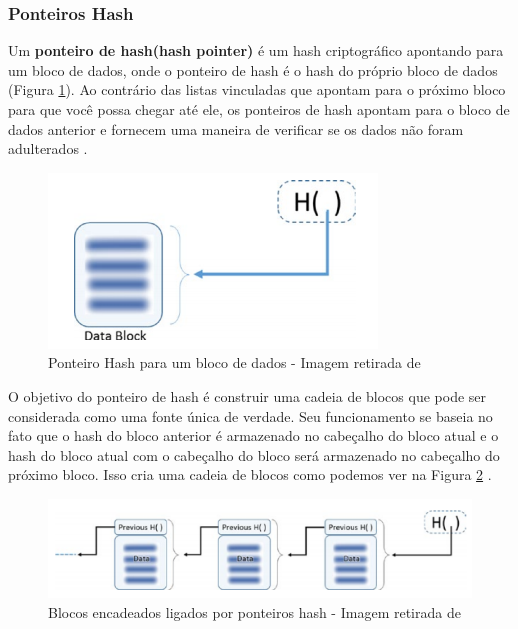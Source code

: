     
        \subsubsection{Ponteiros Hash}
        
            Um \textbf{ponteiro de hash(hash pointer)} é um hash criptográfico apontando para um bloco de dados, onde o ponteiro de hash é o hash do próprio bloco de dados (Figura \ref{fig:hash_pointer}). Ao contrário das listas vinculadas que apontam para o próximo bloco para que você possa chegar até ele, os ponteiros de hash apontam para o bloco de dados anterior e fornecem uma maneira de verificar se os dados não foram adulterados \cite{beginnig_blockchain_bikramaditya}.
            
                \begin{figure}[H]
                     \centering
                     \includegraphics[scale=0.8]{figuras/capitulo_2/hash_pointer.png}
                     \caption{Ponteiro Hash para um bloco de dados - Imagem retirada de \cite{beginnig_blockchain_bikramaditya}}
                     \label{fig:hash_pointer}
                \end{figure}
            
            O objetivo do ponteiro de hash é construir uma cadeia de blocos que pode ser considerada como uma fonte única de verdade. Seu funcionamento se baseia no fato que o hash do bloco anterior é armazenado no cabeçalho do bloco atual e o hash do bloco atual com o cabeçalho do bloco será armazenado no cabeçalho do próximo bloco. Isso cria uma cadeia de blocos como podemos ver na Figura \ref{fig:blocks_linked_hash_pointers} \cite{beginnig_blockchain_bikramaditya}.
            
                \begin{figure}[H]
                     \centering
                     \includegraphics[scale=0.8]{figuras/capitulo_2/blocks_linked_hash_pointers.png}
                     \caption{Blocos encadeados ligados por ponteiros hash - Imagem retirada de \cite{beginnig_blockchain_bikramaditya}}
                     \label{fig:blocks_linked_hash_pointers}
                \end{figure}


